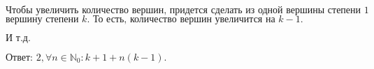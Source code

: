 \documentclass[12pt,a4paper]{scrartcl}
\def\N{\mathbb{N}}
\def\A{\forall}
\begin{document}
\(\text{Чтобы }\allowbreak \text{увеличить }\allowbreak \text{количество }\allowbreak \text{вершин, }\allowbreak \text{придется }\allowbreak \text{сделать }\allowbreak \text{из }\allowbreak \text{одной }\allowbreak \text{вершины }\allowbreak {\text{степени }\allowbreak 1}\)
\(\text{вершину }\allowbreak {\text{степени }\allowbreak k}.\text{ То }\allowbreak \text{есть, }\allowbreak \text{количество }\allowbreak \text{вершин }\allowbreak \text{увеличится }\allowbreak \text{на }\allowbreak k - 1.\)

\(\text{И }\allowbreak \text{т.}\allowbreak \text{д.}\allowbreak \)

\(\text{Ответ: }\allowbreak 2, \A n \in \N_0: k + 1 + n(k - 1).\)





















\medskip
\end{document}
